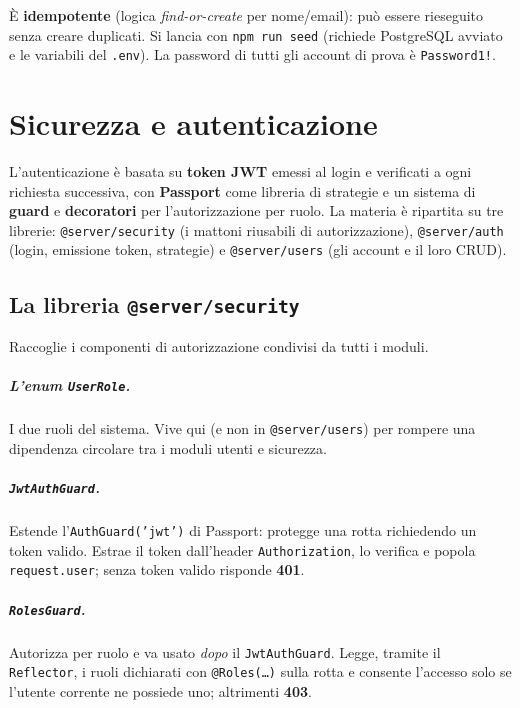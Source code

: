 \documentclass[11pt,a4paper,oneside]{report}
\newcommand{\code}[1]{\texttt{\small #1}}
\newcommand{\file}[1]{\texttt{\small #1}}
\begin{document}
È \textbf{idempotente} (logica \emph{find-or-create} per nome/email): può essere
rieseguito senza creare duplicati. Si lancia con \code{npm run seed} (richiede
PostgreSQL avviato e le variabili del \file{.env}). La password di tutti gli
account di prova è \code{Password1!}.

\chapter{Sicurezza e autenticazione}
\label{cap:auth}

L'autenticazione è basata su \textbf{token JWT} emessi al login e verificati a
ogni richiesta successiva, con \textbf{Passport} come libreria di strategie e un
sistema di \textbf{guard} e \textbf{decoratori} per l'autorizzazione per ruolo.
La materia è ripartita su tre librerie: \code{@server/security} (i mattoni
riusabili di autorizzazione), \code{@server/auth} (login, emissione token,
strategie) e \code{@server/users} (gli account e il loro CRUD).

\section{La libreria \texttt{@server/security}}
Raccoglie i componenti di autorizzazione condivisi da tutti i moduli.

\paragraph{L'enum \code{UserRole}.} I due ruoli del sistema. Vive qui (e non in
\code{@server/users}) per rompere una dipendenza circolare tra i moduli utenti e
sicurezza.

\paragraph{\code{JwtAuthGuard}.} Estende l'\code{AuthGuard('jwt')} di Passport:
protegge una rotta richiedendo un token valido. Estrae il token dall'header
\code{Authorization}, lo verifica e popola \code{request.user}; senza token
valido risponde \textbf{401}.

\paragraph{\code{RolesGuard}.} Autorizza per ruolo e va usato \emph{dopo} il
\code{JwtAuthGuard}. Legge, tramite il \code{Reflector}, i ruoli dichiarati con
\code{@Roles(\ldots)} sulla rotta e consente l'accesso solo se l'utente corrente
ne possiede uno; altrimenti \textbf{403}.
\end{document}
